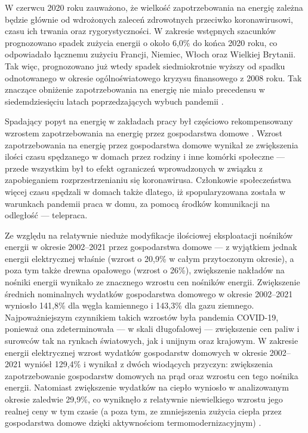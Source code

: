 \documentclass[polish, twoside, 12pt, a4paper]{article}
\theoremstyle{definition}
\theoremstyle{plain}
\theoremstyle{remark}
\begin{document}
W czerwcu 2020 roku zauważono, że wielkość zapotrzebowania na energię zależna będzie głównie od wdrożonych zaleceń zdrowotnych przeciwko koronawirusowi, czasu ich trwania oraz rygorystyczności. W zakresie wstępnych szacunków prognozowano spadek zużycia energii o około 6,0\% do końca 2020 roku, co odpowiadało łącznemu zużyciu Francji, Niemiec, Włoch oraz Wielkiej Brytanii. Tak więc, prognozowano już wtedy spadek siedmiokrotnie wyższy od spadku odnotowanego w okresie ogólnoświatowego kryzysu finansowego z 2008 roku. Tak znaczące obniżenie zapotrzebowania na energię nie miało precedensu w siedemdziesięciu latach poprzedzających wybuch pandemii \citep{kolenda2020}. 

Spadający popyt na energię w zakładach pracy był częściowo rekompensowany wzrostem zapotrzebowania na energię przez gospodarstwa domowe \citep{cire2023}. Wzrost zapotrzebowania na energię przez gospodarstwa domowe wynikał ze zwiększenia ilości czasu spędzanego w domach przez rodziny i inne komórki społeczne --- przede wszystkim był to efekt ograniczeń wprowadzonych w związku z zapobieganiem rozprzestrzenianiu się koronawirusa. Członkowie społeczeństwa więcej czasu spędzali w domach także dlatego, iż spopularyzowana została w warunkach pandemii praca w domu, za pomocą środków komunikacji na odległość --- telepraca. 

Ze względu na relatywnie nieduże modyfikacje ilościowej eksploatacji nośników energii w okresie 2002--2021 przez gospodarstwa domowe --- z wyjątkiem jednak energii elektrycznej właśnie (wzrost o 20,9\% w całym przytoczonym okresie), a poza tym także drewna opałowego (wzrost o 26\%), zwiększenie nakładów na nośniki energii wynikało ze znacznego wzrostu cen nośników energii. Zwiększenie średnich nominalnych wydatków gospodarstwa domowego w okresie 2002--2021 wyniosło 141,8\% dla węgla kamiennego i 143,3\% dla gazu ziemnego. Najpoważniejszym czynnikiem takich wzrostów była pandemia COVID-19, ponieważ ona zdeterminowała --- w skali długofalowej --- zwiększenie cen paliw i surowców tak na rynkach światowych, jak i unijnym oraz krajowym. W zakresie energii elektrycznej wzrost wydatków gospodarstw domowych w okresie 2002--2021 wyniósł 129,4\% i wynikał z dwóch wiodących przyczyn: zwiększenia zapotrzebowanie gospodarstw domowych na prąd oraz wzrostu cen tego nośnika energii. Natomiast zwiększenie wydatków na ciepło wyniosło w analizowanym okresie zaledwie 29,9\%, co wyniknęło z relatywnie niewielkiego wzrostu jego realnej ceny w tym czasie (a poza tym, ze zmniejszenia zużycia ciepła przez gospodarstwa domowe dzięki aktywnościom termomodernizacyjnym) \citep{gus2023}. 
\end{document}
